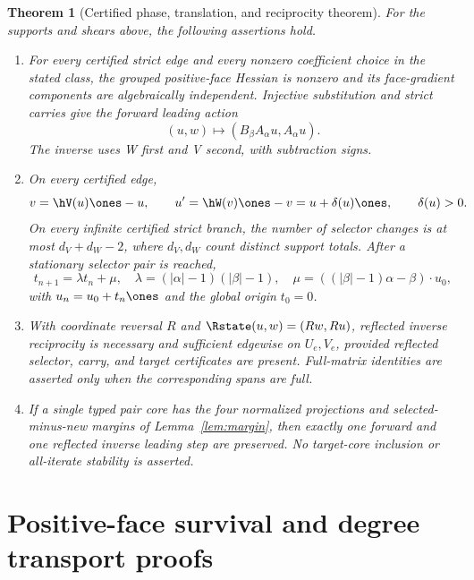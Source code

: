 \documentclass[11pt]{article}
\newtheorem{theorem}{Theorem}[section]
\theoremstyle{definition}
\theoremstyle{remark}
\begin{document}
\begin{theorem}[Certified phase, translation, and reciprocity theorem]
\label{thm:main}
For the supports and shears above, the following assertions hold.

\begin{enumerate}[label=(\Alph*)]
\item For every certified strict edge and every nonzero coefficient choice
  in the stated class, the grouped positive-face Hessian is nonzero and its
  face-gradient components are algebraically independent.  Injective
  substitution and strict carries give the forward leading action
  \[
  (u,w)\longmapsto(B_\beta A_\alpha u,A_\alpha u).
  \]
  The inverse uses W first and V second, with subtraction signs.
\item On every certified edge,
  \[
  v=\hV(u)\ones-u,\qquad
  u'=\hW(v)\ones-v=u+\delta(u)\ones,\qquad \delta(u)>0.
  \]
  On every infinite certified strict branch, the number of selector changes
  is at most $d_V+d_W-2$, where $d_V,d_W$ count distinct support totals.
  After a stationary selector pair is reached,
  \[
  t_{n+1}=\lambda t_n+\mu,\quad
  \lambda=(|\alpha|-1)(|\beta|-1),\quad
  \mu=((|\beta|-1)\alpha-\beta)\cdot u_0,
  \]
  with $u_n=u_0+t_n\ones$ and the global origin $t_0=0$.
\item With coordinate reversal $R$ and
  $\Rstate(u,w)=(Rw,Ru)$, reflected inverse reciprocity is necessary and
  sufficient edgewise on $U_e,V_e$, provided reflected selector, carry, and
  target certificates are present.  Full-matrix identities are asserted
  only when the corresponding spans are full.
\item If a single typed pair core has the four normalized projections and
  selected-minus-new margins of Lemma~\ref{lem:margin}, then exactly one
  forward and one reflected inverse leading step are preserved.  No
  target-core inclusion or all-iterate stability is asserted.
\end{enumerate}
\end{theorem}

\section{Positive-face survival and degree transport proofs}
\end{document}
